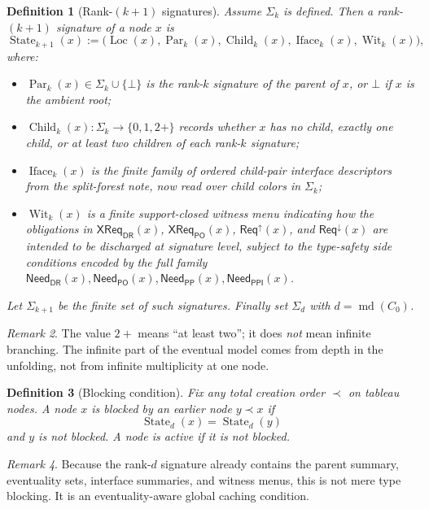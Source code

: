 \documentclass[11pt]{article}
\newtheorem{definition}{Definition}[section]
\theoremstyle{remark}
\newtheorem{remark}[definition]{Remark}
\newcommand{\DR}{\mathsf{DR}}
\newcommand{\PO}{\mathsf{PO}}
\newcommand{\PP}{\mathsf{PP}}
\newcommand{\PPI}{\mathsf{PPI}}
\newcommand{\md}{\operatorname{md}}
\newcommand{\State}{\operatorname{State}}
\newcommand{\Par}{\operatorname{Par}}
\newcommand{\Child}{\operatorname{Child}}
\newcommand{\Iface}{\operatorname{Iface}}
\newcommand{\Wit}{\operatorname{Wit}}
\newcommand{\Loc}{\operatorname{Loc}}
\newcommand{\ReqUp}{\mathsf{Req}^{\uparrow}}
\newcommand{\ReqDown}{\mathsf{Req}^{\downarrow}}
\newcommand{\CrossDR}{\mathsf{XReq}_{\DR}}
\newcommand{\CrossPO}{\mathsf{XReq}_{\PO}}
\newcommand{\NeedDR}{\mathsf{Need}_{\DR}}
\newcommand{\NeedPO}{\mathsf{Need}_{\PO}}
\newcommand{\NeedPP}{\mathsf{Need}_{\PP}}
\newcommand{\NeedPPI}{\mathsf{Need}_{\PPI}}
\begin{document}
\begin{definition}[Rank-$(k+1)$ signatures]
Assume $\Sigma_k$ is defined. Then a rank-$(k+1)$ signature of a node $x$ is
\[
\State_{k+1}(x):=\bigl(\Loc(x),\Par_k(x),\Child_k(x),\Iface_k(x),\Wit_k(x)\bigr),
\]
where:
\begin{itemize}
    \item $\Par_k(x)\in \Sigma_k\cup\{\bot\}$ is the rank-$k$ signature of the parent of $x$, or $\bot$ if $x$ is the ambient root;
    \item $\Child_k(x):\Sigma_k\to\{0,1,2+\}$ records whether $x$ has no child, exactly one child, or at least two children of each rank-$k$ signature;
    \item $\Iface_k(x)$ is the finite family of ordered child-pair interface descriptors from the split-forest note, now read over child colors in $\Sigma_k$;
    \item $\Wit_k(x)$ is a finite support-closed witness menu indicating how the obligations in $\CrossDR(x)$, $\CrossPO(x)$, $\ReqUp(x)$, and $\ReqDown(x)$ are intended to be discharged at signature level, subject to the type-safety side conditions encoded by the full family $\NeedDR(x),\NeedPO(x),\NeedPP(x),\NeedPPI(x)$.
\end{itemize}
Let $\Sigma_{k+1}$ be the finite set of such signatures. Finally set $\Sigma_d$ with $d=\md(C_0)$.
\end{definition}

\begin{remark}
The value $2+$ means ``at least two''; it does \emph{not} mean infinite branching. The infinite part of the eventual model comes from depth in the unfolding, not from infinite multiplicity at one node.
\end{remark}

\begin{definition}[Blocking condition]\label{def:blocking}
Fix any total creation order $\prec$ on tableau nodes. A node $x$ is \emph{blocked} by an earlier node $y\prec x$ if
\[
\State_d(x)=\State_d(y)
\]
and $y$ is not blocked. A node is \emph{active} if it is not blocked.
\end{definition}

\begin{remark}
Because the rank-$d$ signature already contains the parent summary, eventuality sets, interface summaries, and witness menus, this is not mere type blocking. It is an eventuality-aware global caching condition.
\end{remark}
\end{document}
